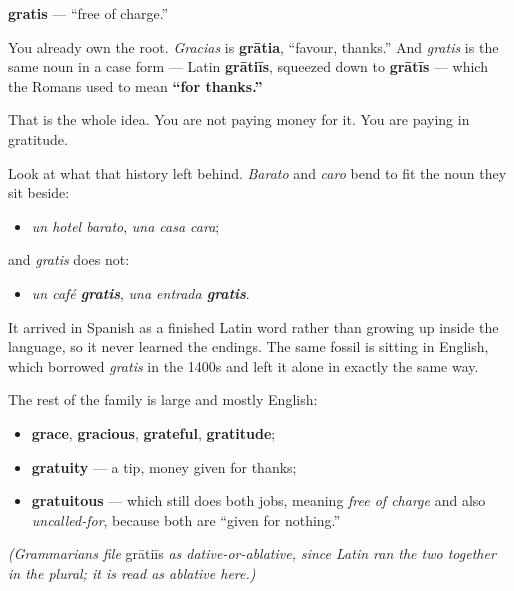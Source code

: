 \begin{cousinweb}
\textbf{gratis} — \textquotedblleft{}free of charge.\textquotedblright{}

You already own the root. \emph{Gracias} is \textbf{grātia}, \textquotedblleft{}favour, thanks.\textquotedblright{} And \emph{gratis} is the same noun in a case form — Latin \textbf{grātiīs}, squeezed down to \textbf{grātīs} — which the Romans used to mean \textbf{\textquotedblleft{}for thanks.\textquotedblright{}}

That is the whole idea. You are not paying money for it. You are paying in gratitude.

Look at what that history left behind. \emph{Barato} and \emph{caro} bend to fit the noun they sit beside:

\begin{itemize}
\raggedright
  \item \emph{un hotel barato}, \emph{una casa cara};
\end{itemize}

and \emph{gratis} does not:

\begin{itemize}
\raggedright
  \item \emph{un café \textbf{gratis}}, \emph{una entrada \textbf{gratis}}.
\end{itemize}

It arrived in Spanish as a finished Latin word rather than growing up inside the language, so it never learned the endings. The same fossil is sitting in English, which borrowed \emph{gratis} in the 1400s and left it alone in exactly the same way.

The rest of the family is large and mostly English:

\begin{itemize}
\raggedright
  \item \textbf{grace}, \textbf{gracious}, \textbf{grateful}, \textbf{gratitude};
  \item \textbf{gratuity} — a tip, money given for thanks;
  \item \textbf{gratuitous} — which still does both jobs, meaning \emph{free of charge} and also \emph{uncalled-for}, because both are \textquotedblleft{}given for nothing.\textquotedblright{}
\end{itemize}

\emph{(Grammarians file} grātiīs \emph{as dative-or-ablative, since Latin ran the two together in the plural; it is read as ablative here.)}
\end{cousinweb}

